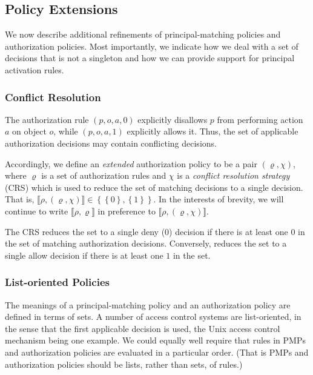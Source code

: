 \documentclass{article}
\newcommand{\semantics}[1]{\llbracket #1 \rrbracket}
\newcommand{\set}[1]{\ensuremath{\left\{#1\right\}}} \newcommand{\setO}[1]{\ensuremath{\left\{#1\right.}} \newcommand{\setC}[1]{\ensuremath{\left.#1\right\}}} \newcommand{\setN}[1]{\ensuremath{\left.#1\right.}} \newcommand{\sett}[1]{\ensuremath{\left\{\textit{#1}\right\}}} \newcommand{\tuple}[1]{\ensuremath{\left(#1\right)}} \newcommand{\tuplet}[1]{\ensuremath{\left(\textit{#1}\right)}} \newcommand{\card}[1]{\left| #1 \right|}
\begin{document}
\subsection{Policy Extensions}\label{sec:model:policy-extensions}

We now describe additional refinements of principal-matching policies and authorization policies.
Most importantly, we indicate how we deal with a set of decisions that is not a singleton and how we can provide support for principal activation rules.

\subsubsection{Conflict Resolution}\label{sec:model:policy-extensions:conflict-resolution}
The authorization rule $(p,o,a,0)$ explicitly disallows $p$ from performing action $a$ on object $o$, while $(p,o,a,1)$ explicitly allows it.
Thus, the set of applicable authorization decisions may contain conflicting decisions.

Accordingly, we define an \emph{extended} authorization policy to be a pair $(\varrho,\chi)$, where $\varrho$ is a set of authorization rules and $\chi$ is a \emph{conflict resolution strategy} (CRS) which is used to reduce the set of matching decisions to a single decision.
That is, \mbox{$\semantics{\rho,(\varrho,\chi)} \in \set{\set{0},\set{1}}$}.
In the interests of brevity, we will continue to write $\semantics{\rho,\varrho}$ in preference to $\semantics{\rho,(\varrho,\chi)}$.

The  CRS reduces the set to a single deny ($0$) decision if there is at least one $0$ in the set of matching authorization decisions.
Conversely,  reduces the set to a single allow decision if there is at least one $1$ in the set.

\subsubsection{List-oriented Policies}\label{sec:model:policy-extensions:list-oriented-policies}
The meanings of a principal-matching policy and an authorization policy are defined in terms of sets.
A number of access control systems are list-oriented, in the sense that the first applicable decision is used, the Unix access control mechanism being one example.
We could equally well require that rules in PMPs and authorization policies are evaluated in a particular order.
(That is PMPs and authorization policies should be lists, rather than sets, of rules.)
\end{document}
